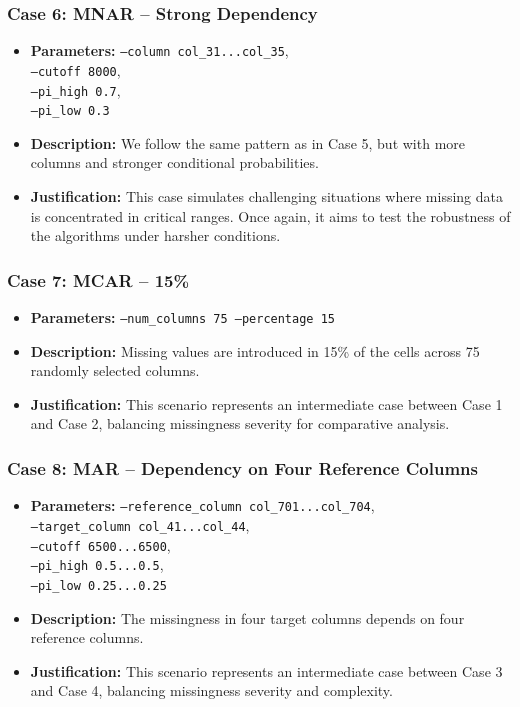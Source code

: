 \documentclass[a4paper,12pt]{article}
\begin{document}
\subsubsection{Case 6: MNAR – Strong Dependency}
\begin{itemize}
    \item \textbf{Parameters:} \texttt{--column col\_31...col\_35},\\
    \texttt{--cutoff 8000},\\
    \texttt{--pi\_high 0.7},\\
    \texttt{--pi\_low 0.3}
    
    \item \textbf{Description:} We follow the same pattern as in Case 5, but with more columns and stronger conditional probabilities.
    
    \item \textbf{Justification:} This case simulates challenging situations where missing data is concentrated in critical ranges. Once again, it aims to test the robustness of the algorithms under harsher conditions.
\end{itemize}

\subsubsection{Case 7: MCAR – 15\%}
\begin{itemize}
    \item \textbf{Parameters:} \texttt{--num\_columns 75 --percentage 15}
    
    \item \textbf{Description:} Missing values are introduced in 15\% of the cells across 75 randomly selected columns.
    
    \item \textbf{Justification:} This scenario represents an intermediate case between Case 1 and Case 2, balancing missingness severity for comparative analysis.
\end{itemize}

\subsubsection{Case 8: MAR – Dependency on Four Reference Columns}
\begin{itemize}
    \item \textbf{Parameters:} \texttt{--reference\_column col\_701...col\_704},\\
    \texttt{--target\_column col\_41...col\_44},\\
    \texttt{--cutoff 6500...6500},\\
    \texttt{--pi\_high 0.5...0.5},\\
    \texttt{--pi\_low 0.25...0.25}
    
    \item \textbf{Description:} The missingness in four target columns depends on four reference columns.
    
    \item \textbf{Justification:} This scenario represents an intermediate case between Case 3 and Case 4, balancing missingness severity and complexity.
\end{itemize}
\end{document}
